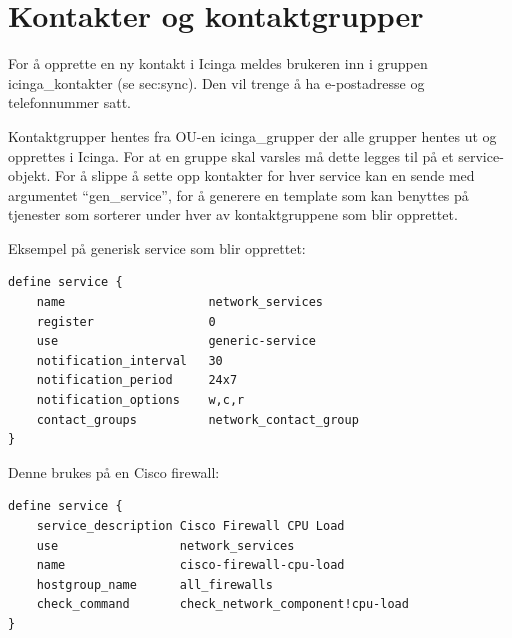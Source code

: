\section{Kontakter og kontaktgrupper}
For å opprette en ny kontakt i Icinga meldes brukeren inn i gruppen icinga\_kontakter (se sec:sync). Den vil trenge å ha e-postadresse og telefonnummer satt.

Kontaktgrupper hentes fra OU-en icinga\_grupper der alle grupper hentes ut og opprettes i Icinga. For at en gruppe skal varsles må dette legges til på et service-objekt. For å slippe å sette opp kontakter for hver service kan en sende med argumentet ``gen\_service'', for å generere en template som kan benyttes på tjenester som sorterer under hver av kontaktgruppene som blir opprettet.

Eksempel på generisk service som blir opprettet:
\begin{lstlisting}[style=example]
define service {
    name 				    network_services
    register 		   		0
    use 			   		generic-service     
    notification_interval   30
    notification_period     24x7
    notification_options    w,c,r
    contact_groups          network_contact_group
}
\end{lstlisting}

Denne brukes på en Cisco firewall: 
\begin{lstlisting}[style=example]
define service {
    service_description Cisco Firewall CPU Load
    use 				network_services
    name 				cisco-firewall-cpu-load
    hostgroup_name 		all_firewalls
    check_command 		check_network_component!cpu-load
}
\end{lstlisting}

